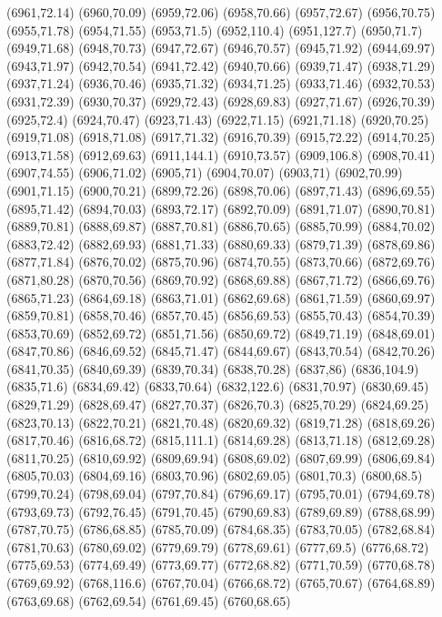 (6961,72.14)
(6960,70.09)
(6959,72.06)
(6958,70.66)
(6957,72.67)
(6956,70.75)
(6955,71.78)
(6954,71.55)
(6953,71.5)
(6952,110.4)
(6951,127.7)
(6950,71.7)
(6949,71.68)
(6948,70.73)
(6947,72.67)
(6946,70.57)
(6945,71.92)
(6944,69.97)
(6943,71.97)
(6942,70.54)
(6941,72.42)
(6940,70.66)
(6939,71.47)
(6938,71.29)
(6937,71.24)
(6936,70.46)
(6935,71.32)
(6934,71.25)
(6933,71.46)
(6932,70.53)
(6931,72.39)
(6930,70.37)
(6929,72.43)
(6928,69.83)
(6927,71.67)
(6926,70.39)
(6925,72.4)
(6924,70.47)
(6923,71.43)
(6922,71.15)
(6921,71.18)
(6920,70.25)
(6919,71.08)
(6918,71.08)
(6917,71.32)
(6916,70.39)
(6915,72.22)
(6914,70.25)
(6913,71.58)
(6912,69.63)
(6911,144.1)
(6910,73.57)
(6909,106.8)
(6908,70.41)
(6907,74.55)
(6906,71.02)
(6905,71)
(6904,70.07)
(6903,71)
(6902,70.99)
(6901,71.15)
(6900,70.21)
(6899,72.26)
(6898,70.06)
(6897,71.43)
(6896,69.55)
(6895,71.42)
(6894,70.03)
(6893,72.17)
(6892,70.09)
(6891,71.07)
(6890,70.81)
(6889,70.81)
(6888,69.87)
(6887,70.81)
(6886,70.65)
(6885,70.99)
(6884,70.02)
(6883,72.42)
(6882,69.93)
(6881,71.33)
(6880,69.33)
(6879,71.39)
(6878,69.86)
(6877,71.84)
(6876,70.02)
(6875,70.96)
(6874,70.55)
(6873,70.66)
(6872,69.76)
(6871,80.28)
(6870,70.56)
(6869,70.92)
(6868,69.88)
(6867,71.72)
(6866,69.76)
(6865,71.23)
(6864,69.18)
(6863,71.01)
(6862,69.68)
(6861,71.59)
(6860,69.97)
(6859,70.81)
(6858,70.46)
(6857,70.45)
(6856,69.53)
(6855,70.43)
(6854,70.39)
(6853,70.69)
(6852,69.72)
(6851,71.56)
(6850,69.72)
(6849,71.19)
(6848,69.01)
(6847,70.86)
(6846,69.52)
(6845,71.47)
(6844,69.67)
(6843,70.54)
(6842,70.26)
(6841,70.35)
(6840,69.39)
(6839,70.34)
(6838,70.28)
(6837,86)
(6836,104.9)
(6835,71.6)
(6834,69.42)
(6833,70.64)
(6832,122.6)
(6831,70.97)
(6830,69.45)
(6829,71.29)
(6828,69.47)
(6827,70.37)
(6826,70.3)
(6825,70.29)
(6824,69.25)
(6823,70.13)
(6822,70.21)
(6821,70.48)
(6820,69.32)
(6819,71.28)
(6818,69.26)
(6817,70.46)
(6816,68.72)
(6815,111.1)
(6814,69.28)
(6813,71.18)
(6812,69.28)
(6811,70.25)
(6810,69.92)
(6809,69.94)
(6808,69.02)
(6807,69.99)
(6806,69.84)
(6805,70.03)
(6804,69.16)
(6803,70.96)
(6802,69.05)
(6801,70.3)
(6800,68.5)
(6799,70.24)
(6798,69.04)
(6797,70.84)
(6796,69.17)
(6795,70.01)
(6794,69.78)
(6793,69.73)
(6792,76.45)
(6791,70.45)
(6790,69.83)
(6789,69.89)
(6788,68.99)
(6787,70.75)
(6786,68.85)
(6785,70.09)
(6784,68.35)
(6783,70.05)
(6782,68.84)
(6781,70.63)
(6780,69.02)
(6779,69.79)
(6778,69.61)
(6777,69.5)
(6776,68.72)
(6775,69.53)
(6774,69.49)
(6773,69.77)
(6772,68.82)
(6771,70.59)
(6770,68.78)
(6769,69.92)
(6768,116.6)
(6767,70.04)
(6766,68.72)
(6765,70.67)
(6764,68.89)
(6763,69.68)
(6762,69.54)
(6761,69.45)
(6760,68.65)
